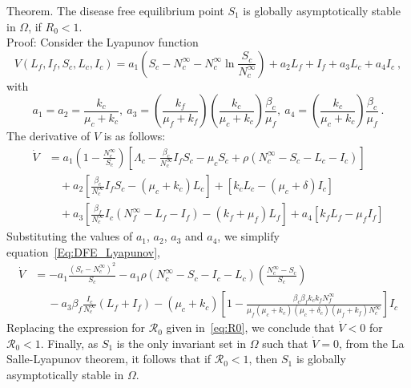\documentclass[preprint, 12pt]{elsarticle}
\begin{document}
\noindent Theorem. The disease free equilibrium point $S_1$ is globally asymptotically stable in $\Omega$, if $R_0<1$.\\
Proof: Consider the Lyapunov function
$$V(L_f,I_f,S_c,L_c,I_c) = a_1\left(S_c - N_{c}^{\infty} - N_{c}^{\infty}\ln{\frac{S_c}{N_{c}^{\infty}}}\right) + a_2 L_f + I_f + a_3 L_c + a_4 I_c~,$$
with
$$
a_1 = a_2 = \frac{k_c}{\mu_c + k_c},\ a_3 = \left(\frac{k_f}{\mu_f + k_f}\right)\left(\frac{k_c}{\mu_c + k_c}\right)\frac{\beta_c}{\mu_f},\ a_4 = \left(\frac{k_c}{\mu_c + k_c}\right)\frac{\beta_c}{\mu_f}~.
$$
The derivative of $V$ is as follows:
\begin{equation}\label{Eq:DFE_Lyapunov}
    \begin{aligned}
    \dot{V} &= a_1\left(1 - \frac{N_{c}^{\infty}}{S_c}\right)\left[\Lambda_c-\frac{\beta_c}{N_c^{\infty}}I_fS_c-\mu_cS_c+\rho \left(N_c^{\infty} - S_c - L_c - I_c\right)\right]\\
    &\quad + a_2 \left[\frac{\beta_c}{N_c^{\infty}}I_fS_c-\left(\mu_c+k_c\right)L_c\right] + \left[k_c L_c-\left(\mu_c +\delta\right)I_c\right]\\
    &\quad + a_3\left[\frac{\beta_f}{N_c^{\infty}}I_c\left(N_f^{\infty} - L_f - I_f\right)-\left(k_f+\mu_f\right)L_f\right] + a_4 \left[k_f L_f-\mu_f I_f \right]
    \end{aligned}
\end{equation}
Substituting the values of $a_1$, $a_2$, $a_3$ and $a_4$, we simplify equation~\ref{Eq:DFE_Lyapunov},
\begin{equation*}
    \begin{aligned}
    \dot{V} &= -a_1\frac{\left(S_c - N_{c}^{\infty}\right)^{2}}{S_c} - a_1\rho\left(N_{c}^{\infty} - S_c - I_c - L_c\right)\left(\frac{N_{c}^{\infty} - S_c}{S_c}\right)\\
    &\quad\ - a_3\beta_f\frac{I_c}{N_{c}^{\infty}}\left(L_f + I_f\right) - \left(\mu_c + k_c\right)\left[1 - \frac{\beta_c\beta_f k_c k_fN_f^{\infty}}{\mu_f(\mu_c+k_c)(\mu_c+\delta_c)(\mu_f+k_f)N_c^{\infty}}\right]I_c
    \end{aligned}
\end{equation*}
Replacing the expression for $\mathcal{R}_{0}$ given in~\eqref{eq:R0}, we conclude that $\dot{V} < 0$ for $\mathcal{R}_{0} < 1$. Finally, as $S_{1}$ is the only invariant set in $\Omega$ such that $\dot{V}=0$, from the La Salle-Lyapunov theorem, it follows that if $\mathcal{R}_{0} < 1$, then $S_{1}$ is globally asymptotically stable in $\Omega$.
\end{document}
